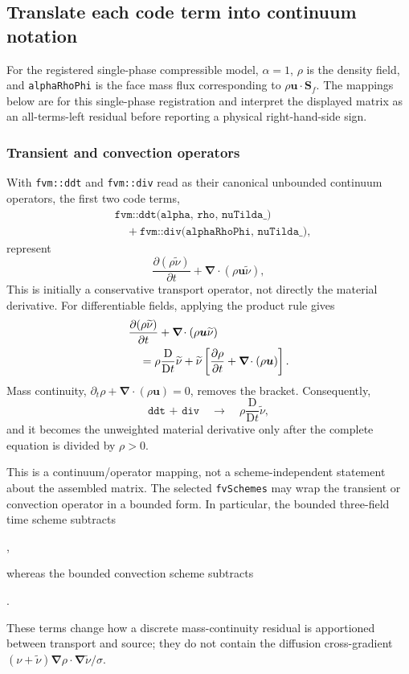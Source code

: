 \documentclass[11pt]{article}
\newcommand{\SADt}{\frac{\mathrm D}{\mathrm Dt}}
\newcommand{\SAgrad}{\boldsymbol{\nabla}}
\newcommand{\SAdiv}{\boldsymbol{\nabla}\!\cdot}
\newcommand{\SAcode}[1]{\texttt{#1}}
\begin{document}
\subsection{Translate each code term into continuum notation}

For the registered single-phase compressible model, \(\alpha=1\), \(\rho\) is
the density field, and \SAcode{alphaRhoPhi} is the face mass flux corresponding
to \(\rho\boldsymbol u\cdot\boldsymbol S_f\).  The mappings below are for this
single-phase registration and interpret the displayed matrix as an
all-terms-left residual before reporting a physical right-hand-side sign.

\subsubsection{Transient and convection operators}

With \SAcode{fvm::ddt} and \SAcode{fvm::div} read as their canonical unbounded
continuum operators, the first two code terms,
\[
\begin{split}
  &\SAcode{fvm::ddt(alpha, rho, nuTilda\_)}
  \\
  &\quad+\SAcode{fvm::div(alphaRhoPhi, nuTilda\_)},
\end{split}
\]
represent
\begin{equation}
  \frac{\partial(\rho\widetilde{\nu})}{\partial t}
  +\SAdiv(\rho\boldsymbol u\widetilde{\nu}),
  \label{eq:sa-native-transport-operators}
\end{equation}
This is initially a conservative transport operator, not directly the
material derivative.  For differentiable fields, applying the product rule
gives
\begin{align}
  &\frac{\partial(\rho\widetilde{\nu})}{\partial t}
  +\SAdiv(\rho\boldsymbol u\widetilde{\nu}) \notag\\
  &\quad={}
  \rho\SADt\widetilde{\nu}
  +\widetilde{\nu}
  \left[
    \frac{\partial\rho}{\partial t}
    +\SAdiv(\rho\boldsymbol u)
  \right].
  \label{eq:sa-native-transport-product-rule}
\end{align}
Mass continuity,
\(\partial_t\rho+\SAdiv(\rho\boldsymbol u)=0\), removes the bracket.
Consequently,
\[
  \SAcode{ddt + div}
  \quad\longrightarrow\quad
  \rho\SADt\widetilde{\nu},
\]
and it becomes the unweighted material derivative only after the complete
equation is divided by \(\rho>0\).

This is a continuum/operator mapping, not a scheme-independent statement about
the assembled matrix.  The selected \SAcode{fvSchemes} may wrap the transient
or convection operator in a bounded form.  In particular, the bounded
three-field time scheme subtracts
\begin{center}
  ,
\end{center}
whereas the bounded convection scheme subtracts
\begin{center}
  .
\end{center}
These terms change how a discrete mass-continuity residual is apportioned
between transport and source; they do not contain the diffusion cross-gradient
\((\nu+\widetilde{\nu})\SAgrad\rho\cdot\SAgrad\widetilde{\nu}/\sigma\).
\end{document}
